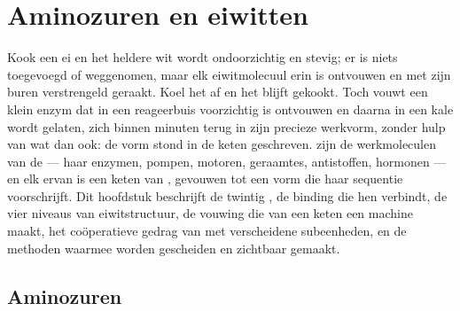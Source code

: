 \chapter{Aminozuren en eiwitten}\label{ch:b1:proteins}

Kook een ei en het heldere wit wordt ondoorzichtig en stevig; er is niets
toegevoegd of weggenomen, maar elk eiwitmolecuul erin is ontvouwen en met zijn
buren verstrengeld geraakt. Koel het af en het blijft gekookt. Toch vouwt een
klein enzym dat in een reageerbuis voorzichtig is ontvouwen en daarna in een kale
 wordt gelaten, zich binnen minuten terug in zijn precieze werkvorm, zonder
hulp van wat dan ook: de vorm stond in de keten geschreven.  zijn de
werkmoleculen van de  --- haar enzymen, pompen, motoren, geraamtes,
antistoffen, hormonen --- en elk ervan is een keten van , gevouwen tot
een vorm die haar sequentie voorschrijft. Dit hoofdstuk beschrijft de twintig
, de binding die hen verbindt, de vier niveaus van eiwitstructuur, de
vouwing die van een keten een machine maakt, het coöperatieve gedrag van 
met verscheidene subeenheden, en de methoden waarmee  worden gescheiden en
zichtbaar gemaakt.

\section{Aminozuren}


